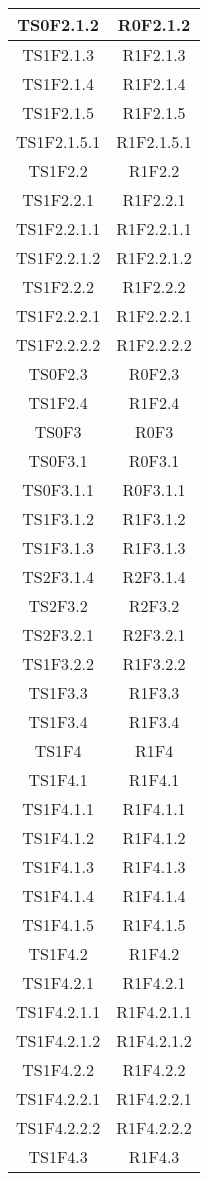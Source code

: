 \begin{longtable}{|c|c|}
    	TS0F2.1.2&R0F2.1.2 \\ \hline
    	TS1F2.1.3&R1F2.1.3 \\ \hline
    	TS1F2.1.4&R1F2.1.4 \\ \hline
    	TS1F2.1.5&R1F2.1.5 \\ \hline
    	TS1F2.1.5.1&R1F2.1.5.1 \\ \hline
    	TS1F2.2&R1F2.2 \\ \hline
    	TS1F2.2.1&R1F2.2.1 \\ \hline
    	TS1F2.2.1.1&R1F2.2.1.1 \\ \hline
    	TS1F2.2.1.2&R1F2.2.1.2 \\ \hline
    	TS1F2.2.2&R1F2.2.2 \\ \hline
    	TS1F2.2.2.1&R1F2.2.2.1 \\ \hline
    	TS1F2.2.2.2&R1F2.2.2.2 \\ \hline
    	TS0F2.3&R0F2.3 \\ \hline
    	TS1F2.4&R1F2.4 \\ \hline
    	TS0F3&R0F3 \\ \hline
    	TS0F3.1&R0F3.1 \\ \hline
    	TS0F3.1.1&	R0F3.1.1 \\ \hline
    	TS1F3.1.2&R1F3.1.2 \\ \hline
    	TS1F3.1.3&R1F3.1.3 \\ \hline
    	TS2F3.1.4&R2F3.1.4 \\ \hline
    	TS2F3.2&R2F3.2 \\ \hline
    	TS2F3.2.1&R2F3.2.1 \\ \hline
    	TS1F3.2.2&R1F3.2.2 \\ \hline
    	TS1F3.3&R1F3.3 \\ \hline
    	TS1F3.4&R1F3.4\\ \hline
    	TS1F4&R1F4 \\ \hline
    	TS1F4.1&R1F4.1 \\ \hline
    	TS1F4.1.1&R1F4.1.1 \\ \hline
    	TS1F4.1.2&R1F4.1.2 \\ \hline
    	TS1F4.1.3&R1F4.1.3 \\ \hline
    	TS1F4.1.4&R1F4.1.4 \\ \hline
    	TS1F4.1.5&R1F4.1.5 \\ \hline
    	TS1F4.2&R1F4.2 \\ \hline
    	TS1F4.2.1&R1F4.2.1 \\ \hline
    	TS1F4.2.1.1&R1F4.2.1.1 \\ \hline
    	TS1F4.2.1.2&R1F4.2.1.2 \\ \hline
    	TS1F4.2.2&R1F4.2.2 \\ \hline
    	TS1F4.2.2.1&R1F4.2.2.1 \\ \hline
    	TS1F4.2.2.2&R1F4.2.2.2 \\ \hline
    	TS1F4.3&R1F4.3 \\ \hline
    	

\end{longtable}
